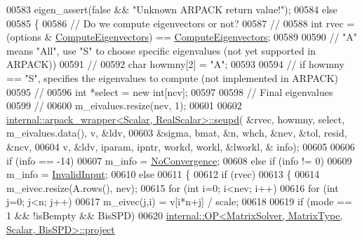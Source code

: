\begin{DoxyCode}
00583     eigen\_assert(\textcolor{keyword}{false} && \textcolor{stringliteral}{"Unknown ARPACK return value!"});
00584   \textcolor{keywordflow}{else}
00585   \{
00586     \textcolor{comment}{// Do we compute eigenvectors or not?}
00587     \textcolor{comment}{//}
00588     \textcolor{keywordtype}{int} rvec = (options & \hyperlink{group__enums_ggae3e239fb70022eb8747994cf5d68b4a9ada93d8885bde32b876ba4af01d3292cc}{ComputeEigenvectors}) == 
      \hyperlink{group__enums_ggae3e239fb70022eb8747994cf5d68b4a9ada93d8885bde32b876ba4af01d3292cc}{ComputeEigenvectors};
00589 
00590     \textcolor{comment}{// "A" means "All", use "S" to choose specific eigenvalues (not yet supported in ARPACK))}
00591     \textcolor{comment}{//}
00592     \textcolor{keywordtype}{char} howmny[2] = \textcolor{stringliteral}{"A"}; 
00593 
00594     \textcolor{comment}{// if howmny == "S", specifies the eigenvalues to compute (not implemented in ARPACK)}
00595     \textcolor{comment}{//}
00596     \textcolor{keywordtype}{int} *select = \textcolor{keyword}{new} \textcolor{keywordtype}{int}[ncv];
00597 
00598     \textcolor{comment}{// Final eigenvalues}
00599     \textcolor{comment}{//}
00600     m\_eivalues.resize(nev, 1);
00601 
00602     \hyperlink{struct_eigen_1_1internal_1_1arpack__wrapper}{internal::arpack\_wrapper<Scalar, RealScalar>::seupd}(
      &rvec, howmny, select, m\_eivalues.data(), v, &ldv,
00603                                                         &sigma, bmat, &n, whch, &nev, &tol, resid, &ncv,
00604                                                         v, &ldv, iparam, ipntr, workd, workl, &lworkl, &
      info);
00605 
00606     \textcolor{keywordflow}{if} (info == -14)
00607       m\_info = \hyperlink{group__enums_gga85fad7b87587764e5cf6b513a9e0ee5eaba1c8763d1179778070f365ecc4157a8}{NoConvergence};
00608     \textcolor{keywordflow}{else} \textcolor{keywordflow}{if} (info != 0)
00609       m\_info = \hyperlink{group__enums_gga85fad7b87587764e5cf6b513a9e0ee5ea945604f62795ffc70aedf2bd12ea0434}{InvalidInput};
00610     \textcolor{keywordflow}{else}
00611     \{
00612       \textcolor{keywordflow}{if} (rvec)
00613       \{
00614         m\_eivec.resize(A.rows(), nev);
00615         \textcolor{keywordflow}{for} (\textcolor{keywordtype}{int} i=0; i<nev; i++)
00616           \textcolor{keywordflow}{for} (\textcolor{keywordtype}{int} j=0; j<n; j++)
00617             m\_eivec(j,i) = v[i*n+j] / scale;
00618       
00619         \textcolor{keywordflow}{if} (mode == 1 && !isBempty && BisSPD)
00620           \hyperlink{struct_eigen_1_1internal_1_1_o_p}{internal::OP<MatrixSolver, MatrixType, Scalar, BisSPD>::project}

\end{DoxyCode}
